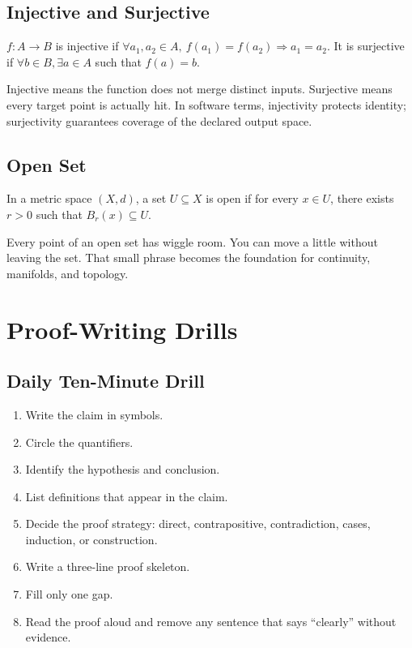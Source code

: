 \documentclass[11pt]{article}
\begin{document}
\subsection{Injective and Surjective}
\begin{formalbox}
$f:A\to B$ is injective if $\forall a_1,a_2\in A,\ f(a_1)=f(a_2)\Rightarrow a_1=a_2$. It is surjective if $\forall b\in B,\exists a\in A$ such that $f(a)=b$.
\end{formalbox}
\begin{intuitionbox}
Injective means the function does not merge distinct inputs. Surjective means every target point is actually hit. In software terms, injectivity protects identity; surjectivity guarantees coverage of the declared output space.
\end{intuitionbox}

\subsection{Open Set}
\begin{formalbox}
In a metric space $(X,d)$, a set $U\subseteq X$ is open if for every $x\in U$, there exists $r>0$ such that $B_r(x)\subseteq U$.
\end{formalbox}
\begin{intuitionbox}
Every point of an open set has wiggle room. You can move a little without leaving the set. That small phrase becomes the foundation for continuity, manifolds, and topology.
\end{intuitionbox}

\section{Proof-Writing Drills}

\subsection{Daily Ten-Minute Drill}
\begin{enumerate}
\item Write the claim in symbols.
\item Circle the quantifiers.
\item Identify the hypothesis and conclusion.
\item List definitions that appear in the claim.
\item Decide the proof strategy: direct, contrapositive, contradiction, cases, induction, or construction.
\item Write a three-line proof skeleton.
\item Fill only one gap.
\item Read the proof aloud and remove any sentence that says ``clearly'' without evidence.
\end{enumerate}
\end{document}
